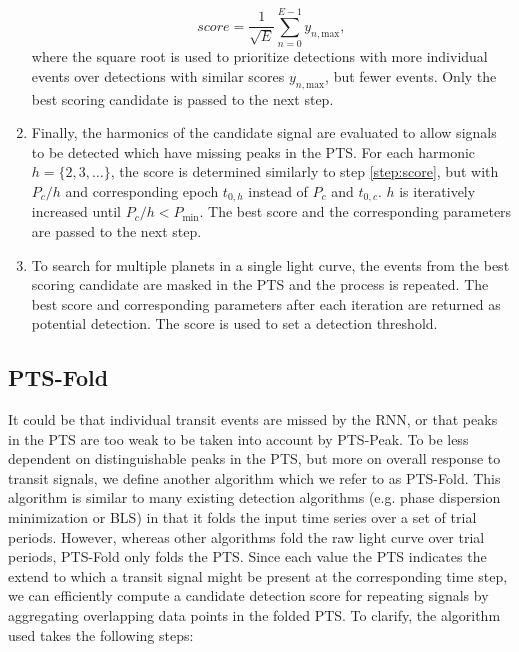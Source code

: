 \begin{enumerate}
    \begin{equation}
        score = \frac{1}{\sqrt{E}}\sum_{n=0}^{E-1} y_{n,\text{max}},
    \end{equation}
    where the square root is used to prioritize detections with more individual events over detections with similar scores $y_{n,\text{max}}$, but fewer events. Only the best scoring candidate is passed to the next step.
    \item\label{step:harmonics}  Finally, the harmonics of the candidate signal are evaluated to allow signals to be detected which have missing peaks in the PTS. For each harmonic $h=\{2,3,\dots\}$, the score is determined similarly to step \ref{step:score}, but with $P_c/h$ and corresponding epoch $t_{0,h}$ instead of $P_c$ and $t_{0,c}$. $h$ is iteratively increased until $P_c/h < P_{\text{min}}$.  The best score and the corresponding parameters are passed to the next step.
    \item To search for multiple planets in a single light curve, the events from the best scoring candidate are masked in the PTS and the process is repeated. The best score and corresponding parameters after each iteration are returned as potential detection. The score is used to set a detection threshold.
    
    
\end{enumerate}
 
\subsection{PTS-Fold}
\label{sec:pts-fold}

It could be that individual transit events are missed by the RNN, or that peaks in the PTS are too weak to be taken into account by PTS-Peak. To be less dependent on distinguishable peaks in the PTS, but more on overall response to transit signals, we define another algorithm which we refer to as PTS-Fold. This algorithm is similar to many existing detection algorithms (e.g. phase dispersion minimization or BLS) in that it folds the input time series over a set of trial periods. However, whereas other algorithms fold the raw light curve over trial periods, PTS-Fold only folds the PTS. Since each value the PTS indicates the extend to which a transit signal might be present at the corresponding time step, we can efficiently compute a candidate detection score for repeating signals by aggregating overlapping data points in the folded PTS. To clarify, the algorithm used takes the following steps:

